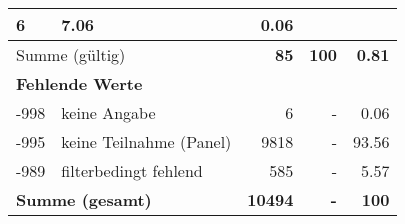 \begin{longtable}{lXrrr}
       \num{6} &
       \num[round-mode=places,round-precision=2]{7.06} &
         \num[round-mode=places,round-precision=2]{0.06} \\
     \midrule
     \multicolumn{2}{l}{Summe (gültig)} &
       \textbf{\num{85}} &
     \textbf{\num{100}} &
       \textbf{\num[round-mode=places,round-precision=2]{0.81}} \\
     \multicolumn{5}{l}{\textbf{Fehlende Werte}}\\
       -998 &
       keine Angabe &
         \num{6} &
        - &
         \num[round-mode=places,round-precision=2]{0.06} \\
       -995 &
       keine Teilnahme (Panel) &
         \num{9818} &
        - &
         \num[round-mode=places,round-precision=2]{93.56} \\
       -989 &
       filterbedingt fehlend &
         \num{585} &
        - &
         \num[round-mode=places,round-precision=2]{5.57} \\
     \midrule
     \multicolumn{2}{l}{\textbf{Summe (gesamt)}} &
          \textbf{\num{10494}} &
        \textbf{-} &
        \textbf{\num{100}} \\
     \bottomrule
     \end{longtable}
     
